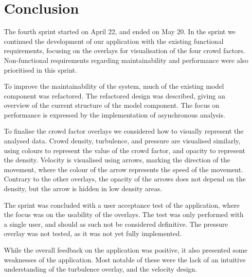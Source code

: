 \section{Conclusion} \label{sec:s4_conclusion}
The fourth sprint started on April 22, and ended on May 20. In the sprint we continued the development of our application with the existing functional requirements, focusing on the overlays for visualisation of the four crowd factors. Non-functional requirements  regarding maintainability and performance were also prioritised in this sprint.

To improve the maintainability of the system, much of the existing model component was refactored. The refactored design was described, giving an overview of the current structure of the model component. The focus on performance is expressed by the implementation of asynchronous analysis.

To finalise the crowd factor overlays we considered how to visually represent the analysed data. Crowd density, turbulence, and pressure are visualised similarly, using colours to represent the value of the crowd factor, and opacity to represent the density. Velocity is visualised using arrows, marking the direction of the movement, where the colour of the arrow represents the speed of the movement. Contrary to the other overlays, the opacity of the arrows does not depend on the density, but the arrow is hidden in low density areas.

The sprint was concluded with a user acceptance test of the application, where the focus was on the usability of the overlays. The test was only performed with a single user, and should as such not be considered definitive. The pressure overlay was not tested, as it was not yet fully implemented.

While the overall feedback on the application was positive, it also presented some weaknesses of the application. Most notable of these were the lack of an intuitive understanding of the turbulence overlay, and the velocity design.


